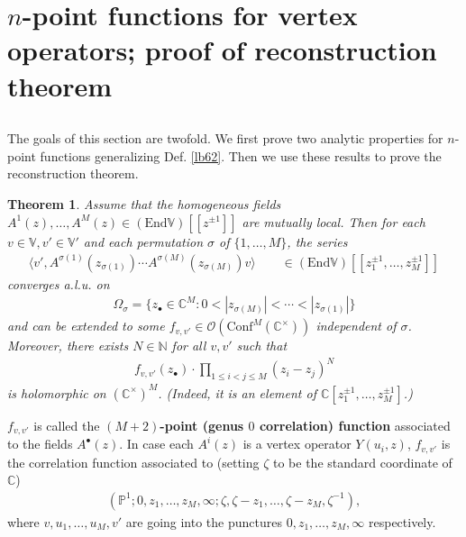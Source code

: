 \documentclass[12pt,a4paper,notitlepage]{article}
\theoremstyle{definition}
\theoremstyle{plain}
\newtheorem{thm}[df]{Theorem}
\newcommand{\End}{\mathrm{End}} %
\newcommand{\Conf}{\mathrm{Conf}}
\newcommand{\bigbk}[1]{\big\langle {#1}\big\rangle}
\newcommand{\scr}{\mathscr}
\newcommand{\blt}{\bullet}
\newcommand{\Vbb}{\mathbb V}
\newcommand{\Cbb}{\mathbb C}
\newcommand{\Nbb}{\mathbb N}
\newcommand{\Pbb}{\mathbb P}
\numberwithin{equation}{section}
\begin{document}
\section{$n$-point functions for vertex operators; proof of reconstruction theorem} \label{lb84}


\subsection{}\label{lb85}

The goals of this section are twofold. We first prove two analytic properties for $n$-point functions generalizing Def. \ref{lb62}. Then we use these results to prove the reconstruction theorem.


\begin{thm}\label{lb74}
Assume that the homogeneous fields $A^1(z),\dots,A^M(z)\in(\End\Vbb)[[z^{\pm1}]]$ are mutually local. Then for each $v\in\Vbb,v'\in\Vbb'$ and each permutation $\sigma$ of $\{1,\dots,M\}$, the series
\begin{align}
\bigbk{v',A^{\sigma(1)}(z_{\sigma(1)})\cdots A^{\sigma(M)}(z_{\sigma(M)})v}\qquad\in(\End\Vbb)[[z_1^{\pm1},\dots,z_M^{\pm1}]]\label{eq116}
\end{align}
converges a.l.u. on
\begin{align}
\Omega_\sigma=\{z_\blt\in\Cbb^M:0<|z_{\sigma(M)}|<\cdots<|z_{\sigma(1)}|\}	\label{eq115}
\end{align}
and can be extended to some $f_{v,v'}\in\scr O(\Conf^M(\Cbb^\times))$ independent of $\sigma$. Moreover, there exists $N\in\Nbb$ for all $v,v'$ such that
\begin{align}
f_{v,v'}(z_\blt)\cdot \prod_{1\leq i<j\leq M}(z_i-z_j)^N	
\end{align}
is holomorphic on $(\Cbb^\times)^M$. (Indeed, it is an element of $\Cbb[z_1^{\pm1},\dots,z_M^{\pm1}]$.)
\end{thm}

$f_{v,v'}$ is called the \textbf{$(M+2)$-point (genus $0$ correlation) function} associated to the fields $A^\blt(z)$. In case each $A^i(z)$ is a vertex operator $Y(u_i,z)$, $f_{v,v'}$ is the correlation function associated to (setting $\zeta$ to be the standard coordinate of $\Cbb$)
\begin{align}
(\Pbb^1;0,z_1,\dots,z_M,\infty;\zeta,\zeta-z_1,\dots,\zeta-z_M,\zeta^{-1}),	
\end{align}
where $v,u_1,\dots,u_M,v'$ are going into the punctures $0,z_1,\dots,z_M,\infty$ respectively.
\end{document}

